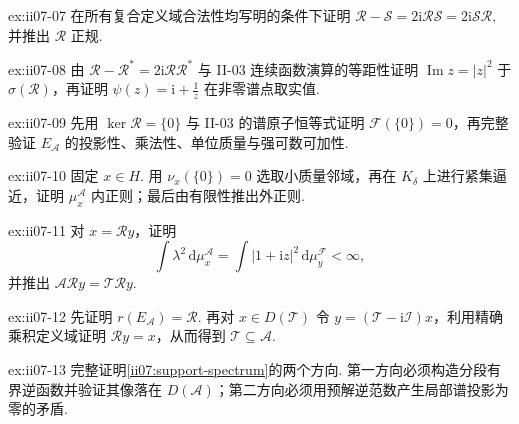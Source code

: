 \begin{FAExercise}[预解正规性]{ex:ii07-07}
在所有复合定义域合法性均写明的条件下证明
\(\displaystyle \mathcal R-\mathcal S =2\mathrm{i}\mathcal R\mathcal S =2\mathrm{i}\mathcal S\mathcal R,\)
并推出 \(\displaystyle\mathcal R\) 正规.
\end{FAExercise}

\begin{FAExercise}[预解谱曲线]{ex:ii07-08}
由 \(\displaystyle\mathcal R-\mathcal R^*=2\mathrm{i}\mathcal R\mathcal R^*\) 与 II-03 连续函数演算的等距性证明 \(\displaystyle\operatorname{Im}z=|z|^2\) 于 \(\displaystyle\sigma(\mathcal R)\)，再证明 \(\displaystyle\psi(z)=\mathrm{i}+\frac{1}{z}\) 在非零谱点取实值.
\end{FAExercise}

\begin{FAExercise}[零谱原子与推送投影值测度]{ex:ii07-09}
先用 \(\displaystyle\ker\mathcal R=\{0\}\) 与 II-03 的谱原子恒等式证明 \(\displaystyle\mathcal F(\{0\})=0\)，再完整验证 \(\displaystyle E_{\mathcal A}\) 的投影性、乘法性、单位质量与强可数可加性.
\end{FAExercise}

\begin{FAExercise}[推送标量测度的正则性]{ex:ii07-10}
固定 \(\displaystyle x\in H\). 用 \(\displaystyle\nu_x(\{0\})=0\) 选取小质量邻域，再在 \(\displaystyle K_\delta\) 上进行紧集逼近，证明 \(\displaystyle\mu_x^{\mathcal A}\) 内正则；最后由有限性推出外正则.
\end{FAExercise}

\begin{FAExercise}[正向谱表示包含]{ex:ii07-11}
对 \(\displaystyle x=\mathcal Ry\)，证明
\[
\int\lambda^2\,\mathrm{d}\mu_x^{\mathcal A}
=
\int|1+\mathrm{i}z|^2\,\mathrm{d}\mu_y^{\mathcal F}<\infty,
\]
并推出 \(\displaystyle\mathcal A\mathcal Ry=\mathcal T\mathcal Ry\).
\end{FAExercise}

\begin{FAExercise}[反向谱表示包含与预解恢复]{ex:ii07-12}
先证明 \(\displaystyle r(E_{\mathcal A})=\mathcal R\). 再对 \(\displaystyle x\in D(\mathcal T)\) 令 \(\displaystyle y=(\mathcal T-\mathrm{i}\mathcal I)x\)，利用精确乘积定义域证明 \(\displaystyle\mathcal Ry=x\)，从而得到 \(\displaystyle\mathcal T\subseteq\mathcal A\).
\end{FAExercise}

\begin{FAExercise}[支撑等于谱]{ex:ii07-13}
完整证明\autoref{ii07:support-spectrum}的两个方向. 第一方向必须构造分段有界逆函数并验证其像落在 \(\displaystyle D(\mathcal A)\)；第二方向必须用预解逆范数产生局部谱投影为零的矛盾.
\end{FAExercise}

